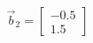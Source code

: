 \documentclass[preview]{standalone}
\begin{document}
\begin{align*}
\vec b_2=\begin{bmatrix}-0.5\\1.5\end{bmatrix}
\end{align*}
\end{document}
